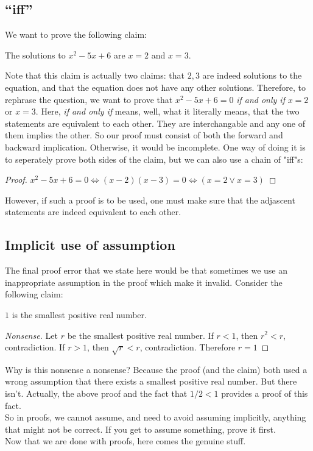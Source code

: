 \subsection{``iff''}
We want to prove the following claim:
\begin{claim}
    The solutions to $x^2-5x+6$ are $x=2$ and $x=3$.
\end{claim}
Note that this claim is actually two claims: that $2,3$ are indeed solutions to the equation, and that the equation does not have any other solutions.
Therefore, to rephrase the question, we want to prove that $x^2-5x+6=0$ \textit{if and only if} $x=2$ or $x=3$.
Here, \textit{if and only if} means, well, what it literally means, that the two statements are equivalent to each other.
They are interchangable and any one of them implies the other.
So our proof must consist of both the forward and backward implication.
Otherwise, it would be incomplete.
One way of doing it is to seperately prove both sides of the claim, but we can also use a chain of "iff"s:
\begin{proof}
    $x^2-5x+6=0\iff (x-2)(x-3)=0\iff (x=2\lor x=3)$
\end{proof}
However, if such a proof is to be used, one must make sure that the adjascent statements are indeed equivalent to each other.
\subsection{Implicit use of assumption}
The final proof error that we state here would be that sometimes we use an inappropriate assumption in the proof which make it invalid.
Consider the following claim:
\begin{claim}
    $1$ is the smallest positive real number.
\end{claim}
\begin{proof}[Nonsense]
    Let $r$ be the smallest positive real number.
    If $r<1$, then $r^2<r$, contradiction.
    If $r>1$, then $\sqrt r<r$, contradiction.
    Therefore $r=1$
\end{proof}
Why is this nonsense a nonsense?
Because the proof (and the claim) both used a wrong assumption that there exists a smallest positive real number.
But there isn't.
Actually, the above proof and the fact that $1/2<1$ provides a proof of this fact.\\
So in proofs, we cannot assume, and need to avoid assuming implicitly, anything that might not be correct.
If you get to assume something, prove it first.\\
Now that we are done with proofs, here comes the genuine stuff.